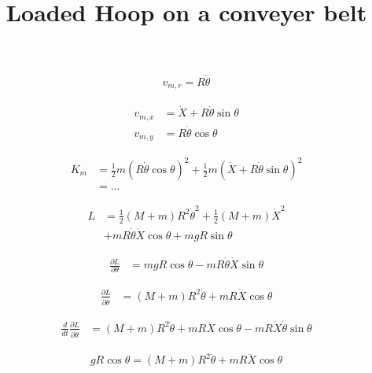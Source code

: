 \documentclass{article}
\title{Loaded Hoop on a conveyer belt}
\date{}
\newcommand{\half}{\frac{1}{2}}
\begin{document}
\maketitle

\begin{align*}
v_{m,r} = R \dot\theta
\end{align*}

\begin{align*}
v_{m,x} &= \dot X + R \dot\theta\sin\theta \\
v_{m,y} &= R \dot\theta\cos\theta
\end{align*}

\begin{align*}
K_m &= \half m (R \dot\theta\cos\theta)^2 + \half m (\dot X + R\dot\theta\sin\theta)^2 \\
&= ...
\end{align*}

\begin{align*}
L &= \half (M+m) R^2 \dot{\theta}^2 + \half (M+m) \dot{X}^2 \\
&+ mR\dot\theta \dot X\cos\theta + mgR\sin\theta
\end{align*}

\begin{align*}
\frac{\partial L}{\partial \theta} &= mgR\cos\theta - mR\dot\theta\dot X \sin\theta
\end{align*}

\begin{align*}
\frac{\partial L}{\partial \dot\theta} &= (M+m) R^2 \dot{\theta} + mR \dot X\cos\theta
\end{align*}

\begin{align*}
\frac{d}{dt}\frac{\partial L}{\partial \dot\theta} &= (M+m) R^2 \ddot{\theta} + mR \ddot X\cos\theta - mR\dot X \dot\theta\sin\theta
\end{align*}

\begin{align*}
gR\cos\theta  = (M+m) R^2 \ddot{\theta} + mR \ddot X\cos\theta
\end{align*}
\end{document}
